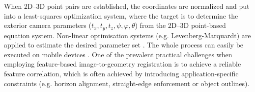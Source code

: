 \documentclass[review]{elsarticle}
\begin{document}
When 2D--3D point pairs are established, the coordinates are normalized and put into a least-squares optimization system, where the target is to determine the exterior camera parameters ($t_x,t_y,t_z,\psi,\varphi,\theta$) from the 2D--3D point-based equation system. Non-linear optimisation systems (e.g. Levenberg-Marquardt) are applied to estimate the desired parameter set \cite{Torr2000}. The whole process can easily be executed on mobile devices \cite{Kehl2016_ISPRS}. One of the prevalent practical challenges when employing feature-based image-to-geometry registration is to achieve a reliable feature correlation, which is often achieved by introducing application-specific constraints (e.g. horizon alignment, straight-edge enforcement or object outlines).


\end{document}
